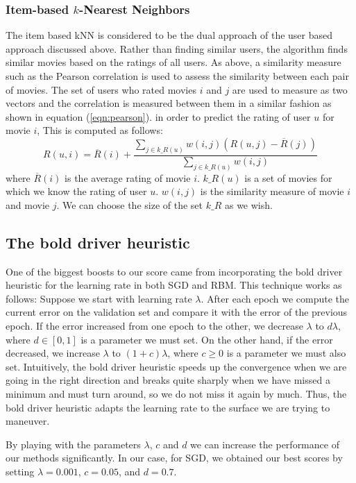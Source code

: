 \documentclass[10pt,conference,compsocconf]{IEEEtran}
\begin{document}
\subsubsection*{\textbf{Item-based $k$-Nearest Neighbors}}  The item based kNN is considered to be the dual approach of the user based approach discussed above. Rather than finding similar users, the algorithm finds similar movies based on the ratings of all users. As above, a similarity measure such as the Pearson correlation is used to assess the similarity between each pair of movies. The set of users who rated movies $i$ and $j$ are used to measure as two vectors and the correlation is measured between them in a similar fashion as shown in equation (\ref{eqn:pearson}). in order to predict the rating of user $u$ for movie $i$, This is computed as follows:
\begin{equation}
R(u,i) = \overline{R}(i) + \frac{\sum_{j \in k\_R(u)} w(i,j)(R(u,j) - \overline{R}(j))}{\sum_{j \in k\_R(u)} w(i,j)}
\end{equation}
where $\overline{R}(i)$ is the average rating of movie $i$. $k\_R(u)$ is a set of movies for which we know the rating of user $u$. $w(i,j)$ is the similarity measure of movie $i$ and movie $j$. We can choose the size of the set $k\_R$ as we wish. 

\subsection{The bold driver heuristic} 
One of the biggest boosts to our score came from incorporating the bold driver heuristic for the learning rate in both SGD and RBM. This technique works as follows: Suppose we start with learning rate $\lambda$. After each epoch we compute the current error on the validation set and compare it with the error of the previous epoch. If the error increased from one epoch to the other, we decrease $\lambda$ to $d\lambda$, where $d\in[0,1]$ is a parameter we must set. On the other hand, if the error decreased, we increase $\lambda$ to $(1+c)\lambda$, where $c\geq 0$ is a parameter we must also set. Intuitively, the bold driver heuristic speeds up the convergence when we are going in the right direction and breaks quite sharply when we have missed a minimum and must turn around, so we do not miss it again by much. Thus, the bold driver heuristic adapts the learning rate to the surface we are trying to maneuver.

By playing with the parameters $\lambda$, $c$ and $d$ we can increase the performance of our methods significantly. In our case, for SGD, we obtained our best scores by setting $\lambda=0.001$, $c=0.05$, and $d=0.7$.
\end{document}
